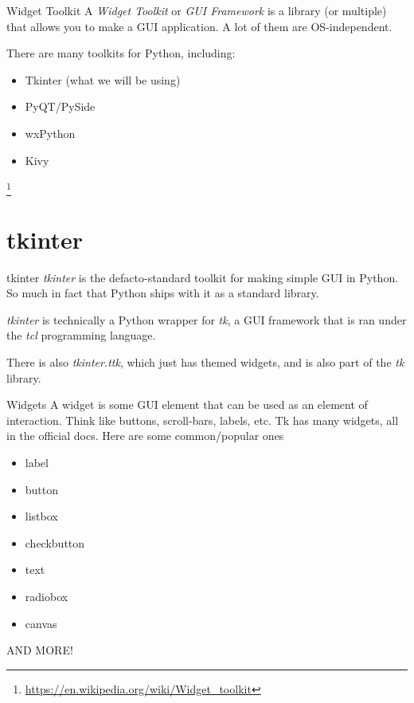 \begin{frame}{Widget Toolkit}
A \textit{Widget Toolkit} or \textit{GUI Framework} is a library (or multiple) that allows you to make a GUI application. A lot of them are OS-independent.

There are many toolkits for Python, including:
\begin{itemize}
  \item Tkinter (what we will be using)
  \item PyQT/PySide
  \item wxPython
  \item Kivy
\end{itemize}

\footnote{\url{https://en.wikipedia.org/wiki/Widget_toolkit}}
\end{frame}

\section{tkinter}

\begin{frame}{tkinter}
\textit{tkinter} is the defacto-standard toolkit for making simple GUI in Python. So much in fact that Python ships with it as a standard library.

\textit{tkinter} is technically a Python wrapper for \textit{tk}, a GUI framework that is ran under the \textit{tcl} programming language.

There is also \textit{tkinter.ttk}, which just has themed widgets, and is also part of the \textit{tk} library.
\end{frame}

\begin{frame}{Widgets}
A widget is some GUI element that can be used as an element of interaction. Think like buttons, scroll-bars, labels, etc.
Tk has many widgets, all in the official docs. Here are some common/popular ones
\begin{multicols}{2}
\begin{itemize}
  \item label
  \item button
  \item listbox
  \item checkbutton
  \item text
  \item radiobox
  \item canvas
\end{itemize}
AND MORE!
\end{multicols}
\end{frame}

